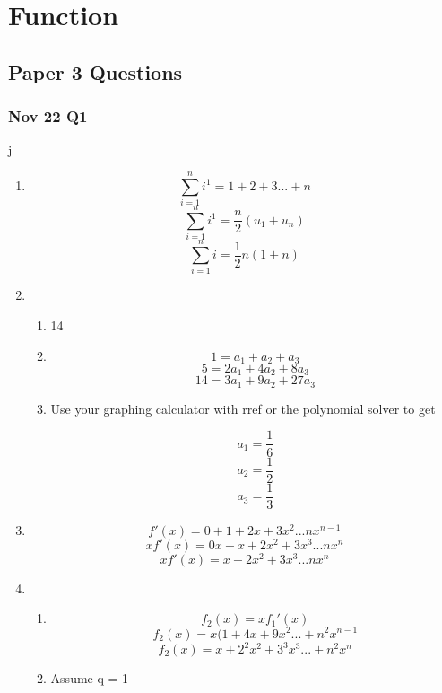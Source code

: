 \documentclass[../main.tex]{subfiles}
\begin{document}
\section{Function}

\subsection{Paper 3 Questions}

\subsubsection{Nov 22 Q1}


\renewcommand{\labelenumi}{\alph{enumi})}
\renewcommand{\labelenumii}{\roman{enumii})}

j
\begin{enumerate}
    \item 
    \[ \sum^n_{i=1} i^1  = 1 + 2 + 3 ... +n \]
    \[ \sum^n_{i=1} i^1 = \frac{n}{2}(u_1 + u_n) \]
    \[ \sum^n_{i=1} i = \frac{1}{2} n (1 + n) \]

    \item
        \begin{enumerate}
            \item
                14

            \item 
                \[ 1 = a_1 + a_2 + a_3 \]
                \[ 5 = 2a_1 + 4a_2 + 8a_3 \]
                \[ 14 = 3a_1 + 9a_2 + 27a_3 \]
            \item
                Use your graphing calculator with rref or the polynomial solver to get

                \[ a_1 = \frac{1}{6} \]
                \[ a_2 = \frac{1}{2} \]
                \[ a_3 = \frac{1}{3} \]

        \end{enumerate}
    \item
    \[ f'(x) = 0 + 1 + 2x + 3x^2 ... nx^{n-1} \]
        \[ xf'(x) = 0x + x + 2x^2 + 3x^3 ... nx^n \]
        \[ xf'(x) = x + 2x^2 + 3x^3 ... nx^n \]
    \item
        \begin{enumerate}
            \item

                \[ f_2(x) = xf_1'(x) \]
                \[ f_2(x) = x(1 + 4x + 9x^2 ... + n^2 x^{n-1} \]
                \[ f_2(x) = x + 2^2 x^2 + 3^3 x^3 ... + n^2 x^n \]
            \item
                Assume q = 1


\end{enumerate}
\end{enumerate}
\end{document}
